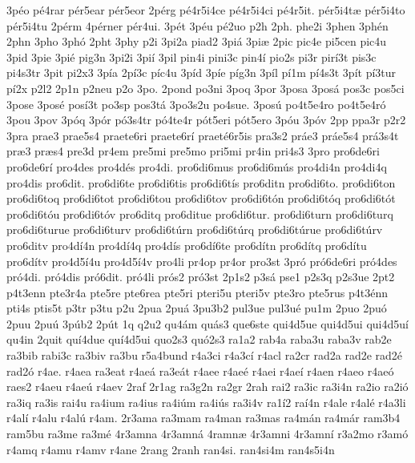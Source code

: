 {3p^^e9o
p^^e94rar
p^^e9r5ear
p^^e9r5eor
2p^^e9rg
p^^e94r5i4ce
p^^e94r5i4ci
p^^e94r5it.
p^^e9r5i4t^^e6
p^^e9r5i4to
p^^e9r5i4tu
2p^^e9rm
4p^^e9rner
p^^e9r4ui.
3p^^e9t
3p^^e9u
p^^e92uo
p2h
2ph.
phe2i
3phen
3ph^^e9n
2phn
3pho
3ph^^f3
2pht
3phy
p2i
3pi2a
piad2
3pi^^e1
3pi^^e6
2pic
pic4e
pi5cen
pic4u
3pid
3pie
3pi^^e9
pig3n
3pi2i
3pi^^ed
3pil
pin4i
pini3c
pin4^^ed
pio2s
pi3r
pir^^ed3t
pis3c
pi4s3tr
3pit
pi2x3
3p^^eda
2p^^ed3c
p^^edc4u
3p^^edd
3p^^ede
p^^edg3n
3p^^edl
p^^ed1m
p^^ed4s3t
3p^^edt
p^^ed3tur
p^^ed2x
p2l2
2p1n
p2neu
p2o
3po.
2pond
po3ni
3poq
3por
3posa
3pos^^e1
pos3c
pos5ci
3pose
3pos^^e9
pos^^ed3t
po3sp
pos3t^^e1
3po3s2u
po4sue.
3pos^^fa
po4t5e4ro
po4t5e4r^^f3
3pou
3pov
3p^^f3q
3p^^f3r
p^^f33s4tr
p^^f34te4r
p^^f3t5eri
p^^f3t5ero
3p^^f3u
3p^^f3v
2pp
ppa3r
p2r2
3pra
prae3
prae5s4
praete6ri
praete6r^^ed
praet^^e96r5is
pra3s2
pr^^e1e3
pr^^e1e5s4
pr^^e13s4t
pr^^e63
pr^^e6s4
pre3d
pr4em
pre5mi
pre5mo
pri5mi
pr4in
pri4s3
3pro
pro6de6ri
pro6de6r^^ed
pro4des
pro4d^^e9s
pro4di.
pro6di6mus
pro6di6m^^fas
pro4di4n
pro4di4q
pro4dis
pro6dit.
pro6di6te
pro6di6tis
pro6di6t^^eds
pro6ditn
pro6di6to.
pro6di6ton
pro6di6toq
pro6di6tot
pro6di6tou
pro6di6tov
pro6di6t^^f3n
pro6di6t^^f3q
pro6di6t^^f3t
pro6di6t^^f3u
pro6di6t^^f3v
pro6ditq
pro6ditue
pro6di6tur.
pro6di6turn
pro6di6turq
pro6di6turue
pro6di6turv
pro6di6t^^farn
pro6di6t^^farq
pro6di6t^^farue
pro6di6t^^farv
pro6ditv
pro4d^^ed4n
pro4d^^ed4q
pro4d^^eds
pro6d^^ed6te
pro6d^^edtn
pro6d^^edtq
pro6d^^edtu
pro6d^^edtv
pro4d5^^ed4u
pro4d5^^ed4v
pro4li
pr4op
pr4or
pro3st
3pr^^f3
pr^^f36de6ri
pr^^f34des
pr^^f34di.
pr^^f34dis
pr^^f36dit.
pr^^f34li
pr^^f3s2
pr^^f33st
2p1s2
p3s^^e1
pse1
p2s3q
p2s3ue
2pt2
p4t3enn
pte3r4a
pte5re
pte6rea
pte5ri
pteri5u
pteri5v
pte3ro
pte5rus
p4t3^^e9nn
pti4s
ptis5t
p3tr
p3tu
p2u
2pua
2pu^^e1
3pu3b2
pul3ue
pul3u^^e9
pu1m
2puo
2pu^^f3
2puu
2pu^^fa
3p^^fab2
2p^^fat
1q
q2u2
qu4^^e1m
qu^^e1s3
que6ste
qui4d5ue
qui4d5ui
qui4d5u^^ed
qu4in
2quit
qu^^ed4due
qu^^ed4d5ui
quo2s3
qu^^f32s3
ra1a2
rab4a
raba3u
raba3v
rab2e
ra3bib
rabi3c
ra3biv
ra3bu
r5a4bund
r4a3ci
r4a3c^^ed
r4acl
ra2cr
rad2a
rad2e
rad2^^e9
rad2^^f3
r4ae.
r4aea
ra3eat
r4ae^^e1
ra3e^^e1t
r4aee
r4ae^^e9
r4aei
r4ae^^ed
r4aen
r4aeo
r4ae^^f3
raes2
r4aeu
r4ae^^fa
r4aev
2raf
2r1ag
ra3g2n
ra2gr
2rah
rai2
ra3ic
ra3i4n
ra2io
ra2i^^f3
ra3iq
ra3is
rai4u
ra4ium
ra4ius
ra4i^^fam
ra4i^^fas
ra3i4v
ra1^^ed2
ra^^ed4n
r4ale
r4al^^e9
r4a3li
r4al^^ed
r4alu
r4al^^fa
r4am.
2r3ama
ra3mam
ra4man
ra3mas
ra4m^^e1n
ra4m^^e1r
ram3b4
ram5bu
ra3me
ra3m^^e9
4r3amna
4r3amn^^e1
4ramn^^e6
4r3amni
4r3amn^^ed
r3a2mo
r3am^^f3
r4amq
r4amu
r4amv
r4ane
2rang
2ranh
ran4si.
ran4si4m
ran4s5i4n
}
